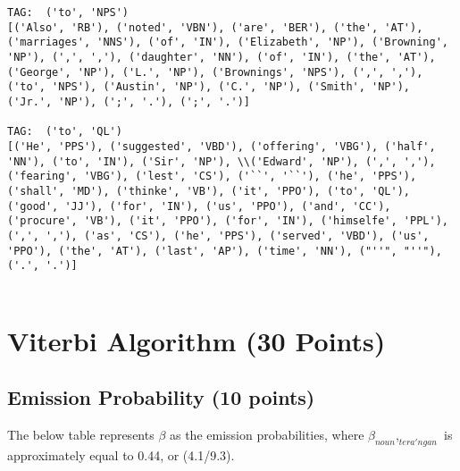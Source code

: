 \documentclass[11pt]{article}
\begin{document}
\begin{enumerate}
\begin{lstlisting}
TAG:  ('to', 'NPS')
[('Also', 'RB'), ('noted', 'VBN'), ('are', 'BER'), ('the', 'AT'), ('marriages', 'NNS'), ('of', 'IN'), ('Elizabeth', 'NP'), ('Browning', 'NP'), (',', ','), ('daughter', 'NN'), ('of', 'IN'), ('the', 'AT'), ('George', 'NP'), ('L.', 'NP'), ('Brownings', 'NPS'), (',', ','), ('to', 'NPS'), ('Austin', 'NP'), ('C.', 'NP'), ('Smith', 'NP'), ('Jr.', 'NP'), (';', '.'), (';', '.')]

TAG:  ('to', 'QL')
[('He', 'PPS'), ('suggested', 'VBD'), ('offering', 'VBG'), ('half', 'NN'), ('to', 'IN'), ('Sir', 'NP'), \\('Edward', 'NP'), (',', ','), ('fearing', 'VBG'), ('lest', 'CS'), ('``', '``'), ('he', 'PPS'), ('shall', 'MD'), ('thinke', 'VB'), ('it', 'PPO'), ('to', 'QL'), ('good', 'JJ'), ('for', 'IN'), ('us', 'PPO'), ('and', 'CC'), ('procure', 'VB'), ('it', 'PPO'), ('for', 'IN'), ('himselfe', 'PPL'), (',', ','), ('as', 'CS'), ('he', 'PPS'), ('served', 'VBD'), ('us', 'PPO'), ('the', 'AT'), ('last', 'AP'), ('time', 'NN'), ("''", "''"), ('.', '.')]


\end{lstlisting}

\end{enumerate}

\section{Viterbi Algorithm (30 Points)}

\subsection{Emission Probability (10 points)}

The below table represents \(\beta\) as the emission probabilities, where  \(\beta_{noun},_{tera'ngan} \) is approximately equal to 0.44, or (4.1/9.3).
\end{document}

